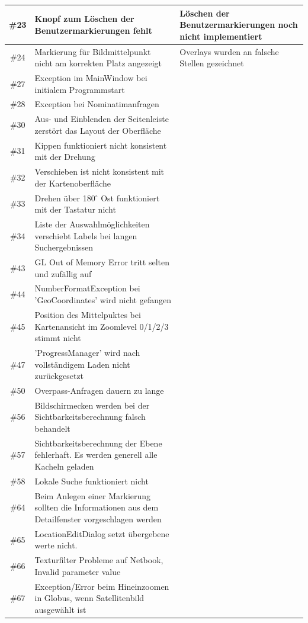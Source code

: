 \documentclass[10pt]{scrreprt}
\begin{document}
\begin{longtable}{|c|p{5.2cm}|p{8.2cm}|}
\hline
\#23 & Knopf zum Löschen der Benutzermarkierungen fehlt & Löschen der Benutzermarkierungen noch nicht implementiert \\
\hline
\#24 & Markierung für Bildmittelpunkt nicht am korrekten Platz angezeigt & Overlays wurden an falsche Stellen gezeichnet \\
\hline
\#27 & Exception im MainWindow bei initialem Programmstart & \\
\hline
\#28 & Exception bei Nominatimanfragen & \\
\hline
\#30 & Aus- und Einblenden der Seitenleiste zerstört das Layout der Oberfläche & \\
\hline
\#31 & Kippen funktioniert nicht konsistent mit der Drehung & \\
\hline
\#32 & Verschieben ist nicht konsistent mit der Kartenoberfläche & \\
\hline
\#33 & Drehen über 180$^\circ$ Ost funktioniert mit der Tastatur nicht & \\
\hline
\#34 & Liste der Auswahlmöglichkeiten verschiebt Labels bei langen Suchergebnissen & \\
\hline
\#43 & GL Out of Memory Error tritt selten und zufällig auf & \\
\hline
\#44 & NumberFormatException bei 'GeoCoordinates' wird nicht gefangen & \\
\hline
\#45 & Position des Mittelpuktes bei Kartenansicht im Zoomlevel 0/1/2/3 stimmt nicht & \\
\hline
\#47 & 'ProgressManager' wird nach vollständigem Laden nicht zurückgesetzt & \\
\hline 
\#50 & Overpass-Anfragen dauern zu lange & \\
\hline
\#56 & Bildschirmecken werden bei der Sichtbarkeitsberechnung falsch behandelt & \\
\hline
\#57 & Sichtbarkeitsberechnung der Ebene fehlerhaft. Es werden generell alle Kacheln geladen & \\
\hline
\#58 & Lokale Suche funktioniert nicht & \\
\hline
\#64 & Beim Anlegen einer Markierung sollten die Informationen aus dem Detailfenster vorgeschlagen werden & \\
\hline
\#65 & LocationEditDialog setzt übergebene werte nicht. & \\
\hline
\#66 & Texturfilter Probleme auf Netbook, Invalid parameter value & \\
\hline
\#67 & Exception/Error beim Hineinzoomen in Globus, wenn Satellitenbild ausgewählt ist & \\

\end{longtable}
\end{document}
